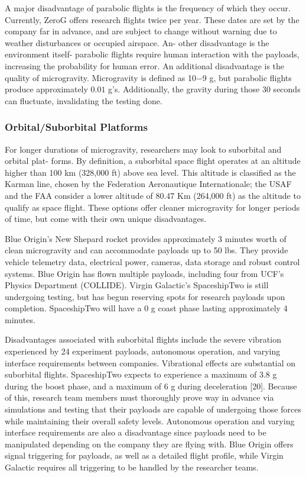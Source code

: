 \indent A major disadvantage of parabolic flights is the frequency of which they occur. Currently, ZeroG offers research flights twice per year. These dates are set by the company far in advance, and are subject to change without warning due to weather disturbances or occupied airspace. An- other disadvantage is the environment itself- parabolic flights require human interaction with the payloads, increasing the probability for human error. An additional disadvantage is the quality of microgravity. Microgravity is defined as 10−9 g, but parabolic flights produce approximately $0.01$ g’s. Additionally, the gravity during those 30 seconds can fluctuate, invalidating the testing done.

\subsubsection{Orbital/Suborbital Platforms}

\indent\indent For longer durations of microgravity, researchers may look to suborbital and orbital plat- forms. By definition, a suborbital space flight operates at an altitude higher than 100 km (328,000 ft) above sea level. This altitude is classified as the Karman line, chosen by the Federation Aeronautique Internationale; the USAF and the FAA consider a lower altitude of 80.47 Km (264,000 ft) as the altitude to qualify as space flight. These options offer cleaner microgravity for longer periods of time, but come with their own unique disadvantages.

\indent Blue Origin’s New Shepard rocket provides approximately 3 minutes worth of clean microgravity and can accommodate payloads up to 50 lbs. They provide vehicle telemetry data, electrical power, cameras, data storage and robust control systems. Blue Origin has flown multiple payloads, including four from UCF’s Physics Department (COLLIDE). Virgin Galactic’s SpaceshipTwo is still undergoing testing, but has begun reserving spots for research payloads upon completion. SpaceshipTwo will have a $0$ g coast phase lasting approximately 4 minutes. 

\indent Disadvantages associated with suborbital flights include the severe vibration experienced by 24
experiment payloads, autonomous operation, and varying interface requirements between companies. Vibrational effects are substantial on suborbital flights. SpaceshipTwo expects to experience a maximum of $3.8$ g during the boost phase, and a maximum of $6$ g during deceleration [20]. Because of this, research team members must thoroughly prove way in advance via simulations and testing that their payloads are capable of undergoing those forces while maintaining their overall safety levels. Autonomous operation and varying interface requirements are also a disadvantage since payloads need to be manipulated depending on the company they are flying with. Blue Origin offers signal triggering for payloads, as well as a detailed flight profile, while Virgin Galactic requires all triggering to be handled by the researcher teams.

